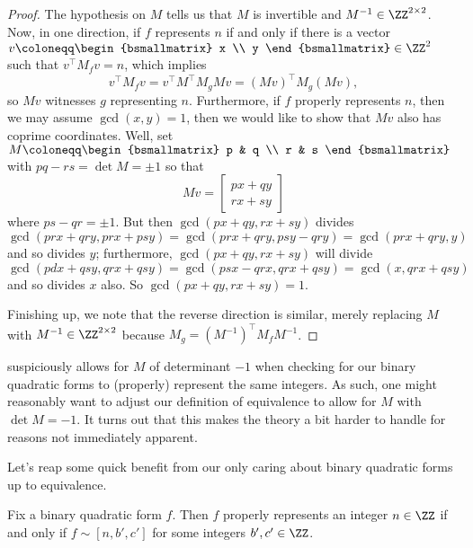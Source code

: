 \documentclass[../notes.tex]{subfiles}
\begin{document}
\begin{proof}
	The hypothesis on $M$ tells us that $M$ is invertible and $M^{-1}\in\ZZ^{2\times2}$. Now, in one direction, if $f$ represents $n$ if and only if there is a vector $v\coloneqq\begin{bsmallmatrix}
		x \\ y
	\end{bsmallmatrix}\in\ZZ^2$ such that $v^\intercal M_fv=n$, which implies
	\[v^\intercal M_fv=v^\intercal M^\intercal M_gMv=(Mv)^\intercal M_g(Mv),\]
	so $Mv$ witnesses $g$ representing $n$. Furthermore, if $f$ properly represents $n$, then we may assume $\gcd(x,y)=1$, then we would like to show that $Mv$ also has coprime coordinates. Well, set $M\coloneqq\begin{bsmallmatrix}
		p & q \\ r & s
	\end{bsmallmatrix}$ with $pq-rs=\det M=\pm1$ so that
	\[Mv=\begin{bmatrix}
		px+qy \\
		rx+sy
	\end{bmatrix}\]
	where $ps-qr=\pm1$. But then $\gcd(px+qy,rx+sy)$ divides $\gcd(prx+qry,prx+psy)=\gcd(prx+qry,psy-qry)=\gcd(prx+qry,y)$ and so divides $y$; furthermore, $\gcd(px+qy,rx+sy)$ will divide $\gcd(pdx+qsy,qrx+qsy)=\gcd(psx-qrx,qrx+qsy)=\gcd(x,qrx+qsy)$ and so divides $x$ also. So $\gcd(px+qy,rx+sy)=1$.
	
	Finishing up, we note that the reverse direction is similar, merely replacing $M$ with $M^{-1}\in\ZZ^{2\times2}$ because $M_g=\left(M^{-1}\right)^\intercal M_fM^{-1}$.
\end{proof}
\begin{remark}
	 suspiciously allows for $M$ of determinant $-1$ when checking for our binary quadratic forms to (properly) represent the same integers. As such, one might reasonably want to adjust our definition of equivalence to allow for $M$ with $\det M=-1$. It turns out that this makes the theory a bit harder to handle for reasons not immediately apparent.
\end{remark}
Let's reap some quick benefit from our only caring about binary quadratic forms up to equivalence.
\begin{proposition} \label{prop:proper-rep-by-equiv}
	Fix a binary quadratic form $f$. Then $f$ properly represents an integer $n\in\ZZ$ if and only if $f\sim[n,b',c']$ for some integers $b',c'\in\ZZ$.
\end{proposition}
\end{document}
